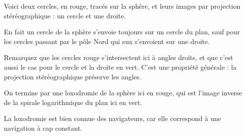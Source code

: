 Voici deux cercles, en rouge, tracés sur la sphère, et leurs images par projection stéréographique : 
un cercle et une droite.
 
En fait un cercle de la sphère s'envoie toujours sur un cercle du plan,
sauf pour les cercles passant par le pôle Nord qui eux s'envoient sur une droite.
 
 
Remarquez que les cercles rouge s'intersectent ici à angles droits,
et que c'est aussi le cas pour le cercle et la droite en vert.
C'est une propriété générale : la projection stéréographique préserve les angles.


\change
On termine par une loxodromie de la sphère ici en rouge, 
qui est l'image inverse de la spirale logarithmique du plan ici en vert.

La loxodromie est bien connue des navigateurs, car elle
correspond à une navigation à cap constant.



